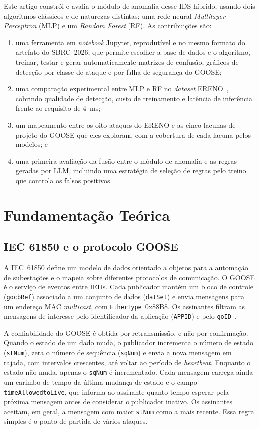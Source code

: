 \documentclass[12pt]{article}
\begin{document}
Este artigo constrói e avalia o módulo de anomalia desse IDS híbrido, usando
dois algoritmos clássicos e de naturezas distintas: uma rede neural
\textit{Multilayer Perceptron} (MLP) e um \textit{Random Forest} (RF). As
contribuições são:
\begin{enumerate}
\item uma ferramenta em \textit{notebook} Jupyter, reprodutível e no mesmo
  formato do artefato do SBRC~2026, que permite escolher a base de dados e o
  algoritmo, treinar, testar e gerar automaticamente matrizes de confusão,
  gráficos de detecção por classe de ataque e por falha de segurança do GOOSE;
\item uma comparação experimental entre MLP e RF no \textit{dataset}
  ERENO~\cite{quincozes2024ereno}, cobrindo qualidade de detecção, custo de
  treinamento e latência de inferência frente ao requisito de 4~ms;
\item um mapeamento entre os oito ataques do ERENO e as cinco lacunas de
  projeto do GOOSE que eles exploram, com a cobertura de cada lacuna pelos
  modelos; e
\item uma primeira avaliação da fusão entre o módulo de anomalia e as regras
  geradas por LLM, incluindo uma estratégia de seleção de regras pelo treino
  que controla os falsos positivos.
\end{enumerate}

\section{Fundamentação Teórica}\label{sec:fund}

\subsection{IEC 61850 e o protocolo GOOSE}

A IEC~61850 define um modelo de dados orientado a objetos para a automação de
subestações e o mapeia sobre diferentes protocolos de comunicação. O GOOSE é o
serviço de eventos entre IEDs. Cada publicador mantém um bloco de controle
(\texttt{gocbRef}) associado a um conjunto de dados (\texttt{datSet}) e envia
mensagens para um endereço MAC \textit{multicast}, com
\texttt{EtherType}~0x88B8. Os assinantes filtram as mensagens de interesse pelo
identificador da aplicação (\texttt{APPID}) e pelo \texttt{goID}~\cite{iec61850-8-1}.

A confiabilidade do GOOSE é obtida por retransmissão, e não por confirmação.
Quando o estado de um dado muda, o publicador incrementa o número de estado
(\texttt{stNum}), zera o número de sequência (\texttt{sqNum}) e envia a nova
mensagem em rajada, com intervalos crescentes, até voltar ao período de
\textit{heartbeat}. Enquanto o estado não muda, apenas o \texttt{sqNum} é
incrementado. Cada mensagem carrega ainda um carimbo de tempo da última
mudança de estado e o campo \texttt{timeAllowedtoLive}, que informa ao
assinante quanto tempo esperar pela próxima mensagem antes de considerar o
publicador inativo. Os assinantes aceitam, em geral, a mensagem com maior
\texttt{stNum} como a mais recente. Essa regra simples é o ponto de partida de
vários ataques.
\end{document}
